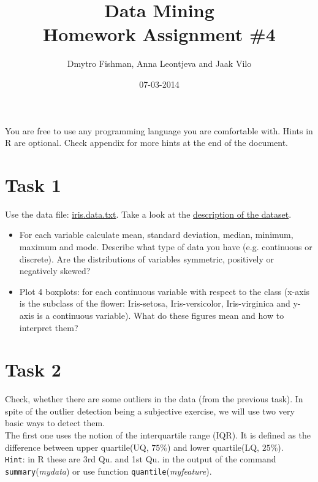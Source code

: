 \documentclass{article}
\title{Data Mining\\Homework Assignment \#4} %
\author{Dmytro Fishman, Anna Leontjeva and Jaak Vilo} %
\date{07-03-2014} %
\begin{document}
\maketitle %

You are free to use any programming language you are comfortable with. Hints in R are optional. Check appendix for more hints at the end of the document.

\section*{Task 1}
Use the data file: \href{http://www0.cs.ucl.ac.uk/staff/m.herbster/GI07/week4/iris.data.txt}{iris.data.txt}. Take a look at the \href{http://archive.ics.uci.edu/ml/datasets/Iris}{description of the dataset}. 
\begin{itemize}
\item For each variable calculate mean, standard deviation, median, minimum, maximum and mode. Describe what type of data you have (e.g. continuous or discrete). Are the distributions of variables symmetric, positively or negatively skewed?
\item Plot 4 boxplots: for each continuous variable with respect to the class (x-axis is the subclass of the flower: Iris-setosa, Iris-versicolor, Iris-virginica and y-axis is a continuous variable). What do these figures mean and how to interpret them? 
\end{itemize}
\section*{Task 2}
Check, whether there are some outliers in the data (from the previous task). In spite of the outlier detection being a subjective exercise, we will use two very basic ways to detect them. 
\\
The first one uses the notion of the interquartile range (IQR). It is defined as the difference between upper quartile(UQ, $75\%$) and lower quartile(LQ, $25\%$).\\ 

\texttt{Hint}: in R these are 3rd Qu. and 1st Qu. in the output of the command \texttt{summary}(\emph{mydata}) or use function \texttt{quantile}(\emph{myfeature}).\\ 
\end{document}
